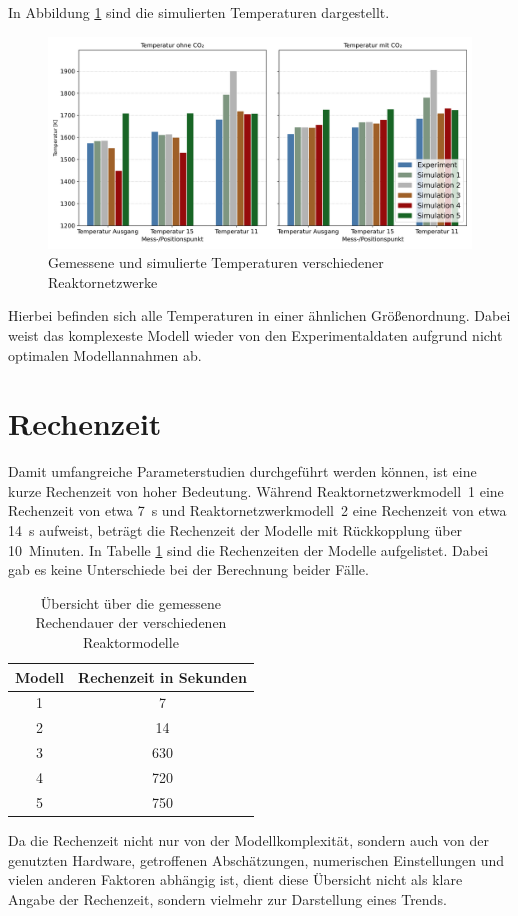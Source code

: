         In Abbildung \ref{fig:auswertung_erweiterungen_temperaturen} sind die simulierten Temperaturen dargestellt. 
        \begin{figure}[H]
            \centering
            \includegraphics[width=1\linewidth]{img/Erweiterungen/Vergleich_Temperaturen.png}
            \caption{Gemessene und simulierte Temperaturen verschiede\-ner Reaktornetzwerke}
            \label{fig:auswertung_erweiterungen_temperaturen}
        \end{figure}
        Hierbei befinden sich alle Temperaturen in einer ähnlichen Größenordnung. Dabei weist das komplexeste Modell wieder von den Experimentaldaten aufgrund nicht optimalen Modellannahmen ab.
    \section{Rechenzeit}
        Damit umfangreiche Parameterstudien durchgeführt werden können, ist eine kurze Rechenzeit von hoher Bedeutung. Während Reaktornetzwerkmodell~1 eine Rechenzeit von etwa 7~s und Reaktornetzwerkmodell~2 eine Rechenzeit von etwa 14~s aufweist, beträgt die Rechenzeit der Modelle mit Rückkopplung über 10~Minuten. In Tabelle \ref{tab:rechendauer} sind die Rechenzeiten der Modelle aufgelistet. Dabei gab es keine Unterschiede bei der Berechnung beider Fälle.
        \begin{table}[H]
            \centering
            \caption{Übersicht über die gemessene Rechendauer der verschiedenen Reaktormodelle}
            \begin{tabular}{c c}
                 \toprule
                 Modell & Rechenzeit in Sekunden \\
                 \midrule
                 1 & 7 \\
                 2 & 14 \\ 
                 3 & 630 \\ 
                 4 & 720 \\ 
                 5 & 750 \\
                 \bottomrule
            \end{tabular}
            \label{tab:rechendauer}
        \end{table}
        Da die Rechenzeit nicht nur von der Modellkomplexität, sondern auch von der genutzten Hardware, getroffenen Abschätzungen, numerischen Einstellungen und vielen anderen Faktoren abhängig ist, dient diese Übersicht nicht als klare Angabe der Rechenzeit, sondern vielmehr zur Darstellung eines Trends. 

